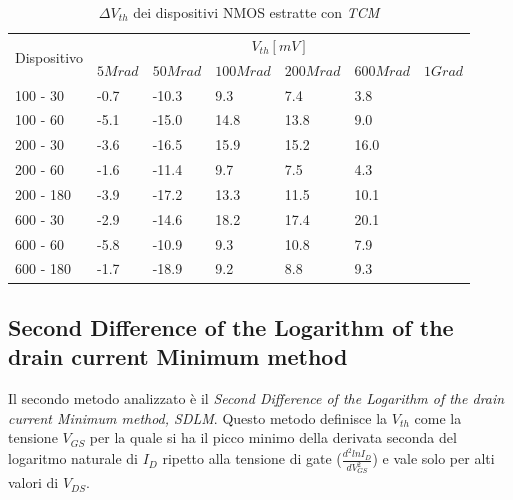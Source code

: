 \documentclass[12pt, letterpaper]{book}
\begin{document}
\begin{table}[H]
  \renewcommand{\arraystretch}{1.3}
    \begin{tabular}{m{2cm}  m{1.1cm} m{1.3cm} m{1.5cm} m{1.5cm} m{1.5cm} m{1cm}}
      \toprule
      \multirow{2}{*}{Dispositivo} & \multicolumn{6}{c}{$V_{th} [mV] $}                                                                    \\
      \cmidrule{2-7}
                                   & $5Mrad$ & $50Mrad$ & $100Mrad$ & $200Mrad$ & $600Mrad$ & $1Grad$ \\
      \midrule
      100 - 30               	& -0.7		& -10.3		& 9.3		& 7.4		& 3.8		&    \\
      \hline
      100 - 60                 	& -5.1		& -15.0		& 14.8		& 13.8		& 9.0		&    \\
      \hline
      200 - 30                  	& -3.6		& -16.5		& 15.9		&15.2		& 16.0		&    \\
      \hline
      200 - 60                    & -1.6		& -11.4		& 9.7		& 7.5		& 4.3		&   \\
      \hline
      200 - 180 			& -3.9		&  -17.2		& 13.3		& 11.5		& 10.1		&    \\
      \hline
      600 - 30                  	& -2.9   		& -14.6		& 18.2		& 17.4		& 20.1		&    \\
      \hline
      600 - 60                    & -5.8   		& -10.9		& 9.3		& 10.8		& 7.9		&   \\
      \hline
      600 - 180              	& -1.7  		& -18.9		& 9.2		& 8.8		& 9.3		&  \\
      \bottomrule
    \end{tabular}
  \caption{$\Delta V_{th}$ dei dispositivi NMOS estratte con \emph{TCM}}
  \label{tab:deltaVthTCMN}
\end{table}








\subsection{Second Difference of the Logarithm of the drain current Minimum method}

Il secondo metodo analizzato è il \emph{Second Difference of the Logarithm of the drain current Minimum method, SDLM}. Questo metodo definisce la $V_{th}$ come la tensione $V_{GS}$ per la quale si ha il picco minimo della derivata seconda del logaritmo naturale di $I_D$ ripetto alla tensione di gate ($\frac{d^2lnI_D}{dV_{GS}^2}$) e vale solo per alti valori di $V_{DS}$. \\
\end{document}

